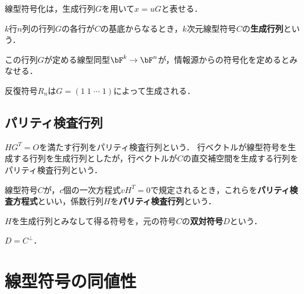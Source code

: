 \documentclass[uplatex,dvipdfmx]{jsreport}
\begin{document}
\begin{tcolorbox}[colframe=ForestGreen, colback=ForestGreen!10!white,breakable,colbacktitle=ForestGreen!40!white,coltitle=black,fonttitle=\bfseries\sffamily,
title=]
    線型符号化は，生成行列$G$を用いて$x=uG$と表せる．
\end{tcolorbox}

\begin{definition}
    $k$行$n$列の行列$G$の各行が$C$の基底からなるとき，$k$次元線型符号$C$の\textbf{生成行列}という．
\end{definition}
\begin{remarks}
    この行列$G$が定める線型同型$\bF^k\to\bF^n$が，情報源からの符号化を定めるとみなせる．
\end{remarks}

\begin{example}
    反復符号$R_n$は$G=(1\;1\;\cdots\;1)$によって生成される．
\end{example}

\subsection{パリティ検査行列}

\begin{tcolorbox}[colframe=ForestGreen, colback=ForestGreen!10!white,breakable,colbacktitle=ForestGreen!40!white,coltitle=black,fonttitle=\bfseries\sffamily,
title=]
    $HG^T=O$を満たす行列をパリティ検査行列という．
    行ベクトルが線型符号を生成する行列を生成行列としたが，行ベクトルが$C$の直交補空間を生成する行列をパリティ検査行列という．
\end{tcolorbox}

\begin{definition}
    線型符号$C$が，$c$個の一次方程式$vH^T=0$で規定されるとき，これらを\textbf{パリティ検査方程式}といい，係数行列$H$を\textbf{パリティ検査行列}という．
\end{definition}

\begin{definition}
    $H$を生成行列とみなして得る符号を，元の符号$C$の\textbf{双対符号}$D$という．
\end{definition}

\begin{lemma}
    $D=C^\perp$．
\end{lemma}

\section{線型符号の同値性}
\end{document}
